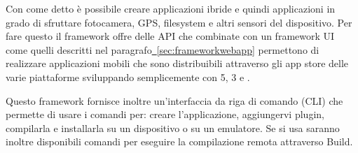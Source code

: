             Con \pg{} come detto è possibile creare applicazioni ibride e quindi
            applicazioni in grado di sfruttare fotocamera, GPS, filesys\-tem e
            altri sensori del dispositivo. Per fare questo il frame\-work offre
            delle API \js{} che combinate con un frame\-work UI come quelli descritti
            nel paragrafo\hyperref[sec:frameworkwebapp]{~\ref{sec:frameworkwebapp}}
            permettono di realizzare applicazioni mobili che sono distribuibili
            attraverso gli app store delle varie piattaforme sviluppando
            semplicemente con \html{}5, \css{}3 e \js{}.

            Questo frame\-work fornisce inoltre un'interfaccia da riga di comando (CLI)
            che permette di usare i comandi per: creare l'applicazione, aggiungervi
            plugin, compilarla e installarla su un dispositivo o su un emulatore.
            Se si usa \pg{} saranno inoltre disponibili comandi per eseguire
            la compilazione remota attraverso \pg{} Build.

